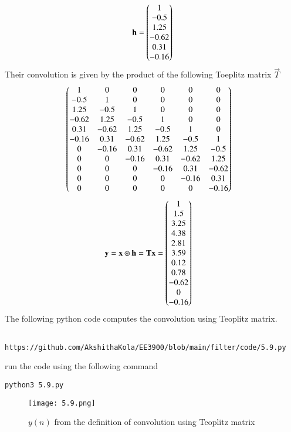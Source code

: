 \documentclass[journal,12pt,twocolumn]{IEEEtran}
\renewcommand\thesection{\arabic{section}}
\begin{document}
\begin{enumerate}[label=\thesection.\arabic*]
\begin{align}
\textbf{h} = \begin{pmatrix}1 \\ -0.5 \\ 1.25 \\ -0.62 \\ 0.31 \\ -0.16\end{pmatrix}
\end{align}
Their convolution is given by the product of the following Toeplitz matrix $\vec{T}$
\begin{align}
		&\begin{pmatrix}
			1 & 0 & 0 & 0 & 0 & 0 \\
			-0.5 & 1 & 0 & 0 & 0 & 0 \\
			1.25 & -0.5 & 1 & 0 & 0 & 0 \\
			-0.62 & 1.25 & -0.5 & 1 & 0 & 0 \\
			0.31 & -0.62 & 1.25 & -0.5 & 1 & 0 \\
			-0.16 & 0.31 & -0.62 & 1.25 & -0.5 & 1 \\
			0 & -0.16 & 0.31 & -0.62 & 1.25 & -0.5 \\
			0 & 0 & -0.16 & 0.31 & -0.62 & 1.25 \\
			0 & 0 & 0 & -0.16 & 0.31 & -0.62 \\
			0 & 0 & 0 & 0 & -0.16 & 0.31 \\
			0 & 0 & 0 & 0 & 0 & -0.16 \\
		\end{pmatrix} 
\end{align}
\begin{align}
&\textbf{y} = \textbf{x} \circledast \textbf{h} = \textbf{Tx} = \begin{pmatrix}1 \\ 1.5 \\ 3.25 \\ 4.38 \\ 2.81 \\ 3.59 \\ 0.12 \\ 0.78 \\ -0.62 \\ 0 \\ -0.16\end{pmatrix}
\end{align}
The following python code computes the convolution using Teoplitz matrix.
\begin{lstlisting}
	https://github.com/AkshithaKola/EE3900/blob/main/filter/code/5.9.py
\end{lstlisting}
run the code using the following command
\begin{lstlisting}
python3 5.9.py
\end{lstlisting}
\begin{figure}[!htbp]
\centering
\texttt{[image: 5.9.png]}
\caption{$y(n)$ from the definition of convolution using Teoplitz matrix}

\end{figure}
\end{enumerate}
\end{document}
